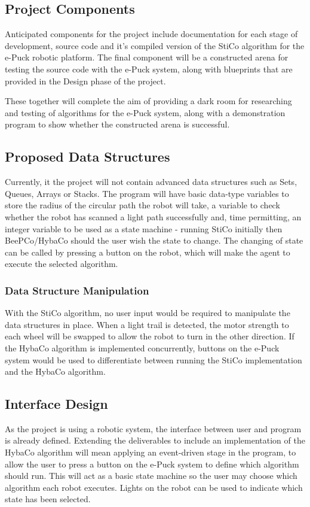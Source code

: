 \subsection{Project Components} \label{desSysComp}
Anticipated components for the project include documentation for each stage of
development, source code and it's compiled version of the StiCo algorithm for
the e-Puck robotic platform.  The final component will be a constructed arena
for testing the source code with the e-Puck system, along with blueprints that
are provided in the Design phase of the project.

These together will complete the aim of providing a dark room for researching
and testing of algorithms for the e-Puck system, along with a demonstration
program to show whether the constructed arena is successful.

\subsection{Proposed Data Structures} \label{desSysData}
Currently, it the project will not contain advanced data structures
such as Sets, Queues, Arrays or Stacks.  The program will have basic data-type
variables to store the radius of the circular path the robot will take, a 
variable to check whether the robot has scanned a light path successfully and,
time permitting, an integer variable to be used as a state machine - running
StiCo initially then BeePCo/HybaCo should the user wish the state to change.
The changing of state can be called by pressing a button on the robot, which 
will make the agent to execute the selected algorithm.

\subsubsection{Data Structure Manipulation} \label{desSysDataMan}
With the StiCo algorithm, no user input would be required to manipulate the
data structures in place.  When a light trail is detected, the motor strength
to each wheel will be swapped to allow the robot to turn in the other 
direction.  If the HybaCo algorithm is implemented concurrently, buttons on the
e-Puck system would be used to differentiate between running the StiCo
implementation and the HybaCo algorithm.

\subsection{Interface Design} \label{desSysInt}
As the project is using a robotic system, the interface between user and program
is already defined.  Extending the deliverables to include an implementation of
the HybaCo algorithm will mean applying an event-driven stage in the program, to
allow the user to press a button on the e-Puck system to define which algorithm
should run.  This will act as a basic state machine so the user may choose
which algorithm each robot executes. Lights on the robot can be used to indicate
which state has been selected.

